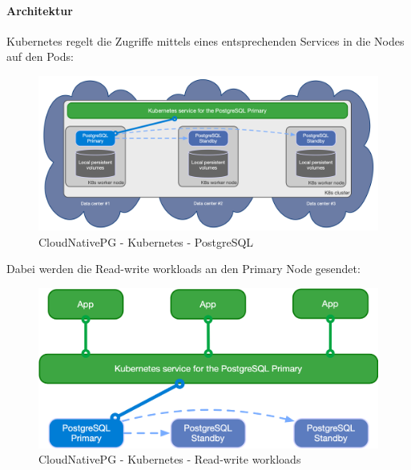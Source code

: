 \begin{flushleft}
    \paragraph{Architektur}
    Kubernetes regelt die Zugriffe mittels eines entsprechenden Services in die Nodes auf den Pods:
    \begin{figure}[H]
        \centering
        \includegraphics[width=0.75\linewidth]{source/implementation/evaluation/postgresql_ha_solutions/cloudnativepg/k8s-pg-architecture}
        \caption{CloudNativePG - Kubernetes - PostgreSQL}
        \label{fig:k8s-pg-architecture}
    \end{figure}
\end{flushleft}
\begin{flushleft}
    Dabei werden die Read-write workloads an den Primary Node gesendet:
    \begin{figure}[H]
        \centering
        \includegraphics[width=0.75\linewidth]{source/implementation/evaluation/postgresql_ha_solutions/cloudnativepg/cloudnativepg-architecture-rw}
        \caption{CloudNativePG - Kubernetes - Read-write workloads}
        \label{fig:cloudnativepg-architecture-rw}
    \end{figure}
\end{flushleft}
